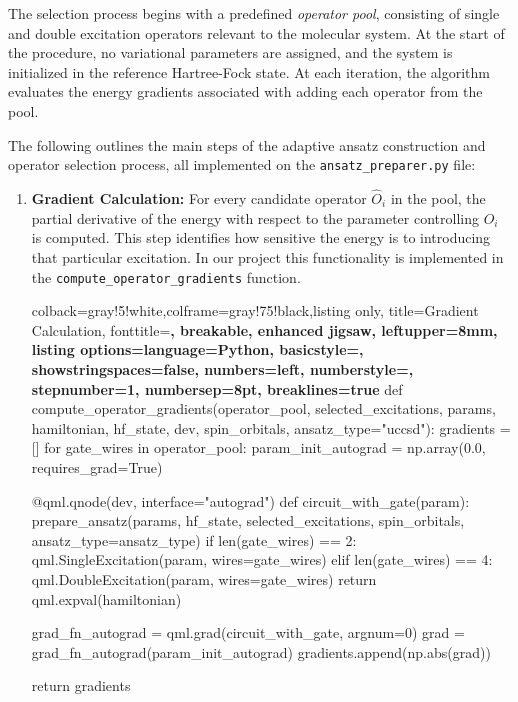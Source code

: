 The selection process begins with a predefined \textit{operator pool}, consisting of single and double excitation operators relevant to the molecular system. At the start of the procedure, no variational parameters are assigned, and the system is initialized in the reference Hartree-Fock state. At each iteration, the algorithm evaluates the energy gradients associated with adding each operator from the pool.

The following outlines the main steps of the adaptive ansatz construction and operator selection process, all implemented on the \texttt{ansatz\_preparer.py} file:

\begin{enumerate}
    \item \textbf{Gradient Calculation:} For every candidate operator $\hat{O}_i$ in the pool, the partial derivative of the energy with respect to the parameter controlling $\hat{O}_i$ is computed. This step identifies how sensitive the energy is to introducing that particular excitation. In our project this functionality is implemented in the \texttt{compute\_operator\_gradients} function.
    \begin{tcblisting}{colback=gray!5!white,colframe=gray!75!black,listing only,
        title=Gradient Calculation, fonttitle=\bfseries, breakable, enhanced jigsaw, leftupper=8mm,
        listing options={language=Python, basicstyle=\ttfamily\small,
        showstringspaces=false, numbers=left, numberstyle=\footnotesize, stepnumber=1, numbersep=8pt, breaklines=true}}
def compute_operator_gradients(operator_pool, selected_excitations, params, hamiltonian, hf_state, dev, spin_orbitals, ansatz_type="uccsd"): 
    gradients = []
    for gate_wires in operator_pool:
        param_init_autograd = np.array(0.0, requires_grad=True)
    
        @qml.qnode(dev, interface="autograd")
        def circuit_with_gate(param):
            prepare_ansatz(params, hf_state, selected_excitations, spin_orbitals, ansatz_type=ansatz_type)
            if len(gate_wires) == 2:
                qml.SingleExcitation(param, wires=gate_wires)
            elif len(gate_wires) == 4:
                qml.DoubleExcitation(param, wires=gate_wires)
            return qml.expval(hamiltonian)
    
        grad_fn_autograd = qml.grad(circuit_with_gate, argnum=0)
        grad = grad_fn_autograd(param_init_autograd)
        gradients.append(np.abs(grad))
    
    return gradients
      \end{tcblisting}
    

\end{enumerate}

